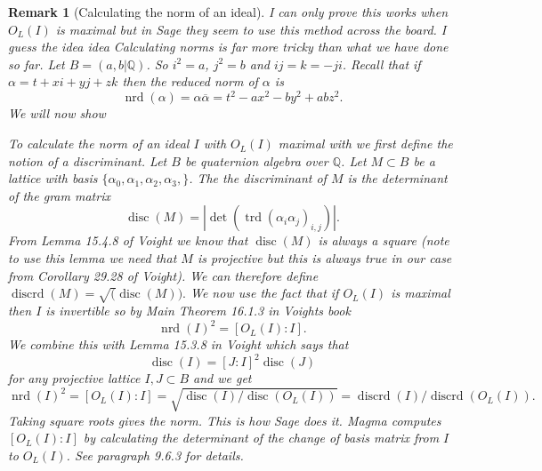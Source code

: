 \documentclass[10pt]{article}
\theoremstyle{plain}
\newtheorem{remark}[theorem]{Remark}
\theoremstyle{definition}
\newcommand{\op}{\operatorname}
\newcommand{\Q}{\mathbb{Q}}
\newcommand{\nrd}{\op{nrd}}
\newcommand{\trd}{\op{trd}}
\newcommand{\disc}{\op{disc}}
\begin{document}
\begin{remark}[Calculating the norm of an ideal]
    {\color{red} I can only prove this works when \( O_L(I) \) is maximal but in Sage they seem to use this method across the board. I guess the idea idea }
    Calculating norms is far more tricky than what we have done so far.
    Let \( B = (a, b | \Q )\).
    So \( i^2 = a \), \( j^2 = b \) and \( ij = k = -ji \).
    Recall that if \( \alpha = t + xi + yj + zk \) then the reduced norm of \( \alpha \) is
    \[
        \nrd(\alpha) = \alpha \overline{\alpha} = t^2 - ax^2 - by^2 + abz^2.
    \]
    We will now show


    To calculate the norm of an ideal \( I \) with \( O_L(I) \) maximal with  we first define the notion of a \emph{discriminant}.
    Let \( B \) be quaternion algebra over \( \Q \).
    Let \( M \subset B \) be a lattice with basis \( \{\alpha_0, \alpha_1, \alpha_2, \alpha_3,\} \).
    The the discriminant of \( M \) is the determinant of the gram matrix
    \[
        \disc(M) = |\det(\trd(\alpha_i \alpha_j)_{i, j})|.
    \]
    From Lemma 15.4.8 of Voight we know that \( \disc(M) \) is always a square (note to use this lemma we need that \( M \) is projective but this is always true in our case from Corollary 29.28 of Voight).
    We can therefore define \( \op{discrd}(M) = \sqrt(\disc(M)). \)
    We now use the fact that if \( O_L(I) \) is maximal then \( I \) is invertible so by Main Theorem 16.1.3 in Voights book
    \[
        \nrd(I)^2 = [O_L(I) : I].
    \]
    We combine this with Lemma 15.3.8 in Voight which says that
    \[
        \disc(I) = [J : I]^2\disc(J)
    \]
    for any projective lattice \( I, J \subset B \) and we get
    \[
        \nrd(I)^2
        = [O_L(I) : I]
        = \sqrt{\disc(I) / \disc(O_L(I))}
        = \op{discrd}(I) / \op{discrd}(O_L(I)).
    \]
    Taking square roots gives the norm.
    This is how Sage does it.
    Magma computes \( [O_L(I) : I] \) by calculating the determinant of the change of basis matrix from \( I \) to \( O_L(I) \).
    See paragraph 9.6.3 for details.
\end{remark}
\end{document}
